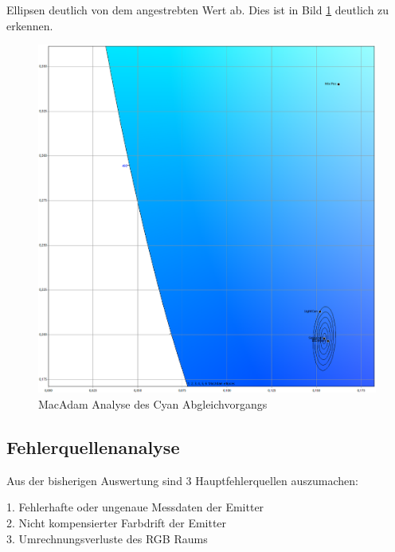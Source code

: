 \documentclass[11pt]{scrartcl}
\begin{document}
Ellipsen deutlich von dem angestrebten Wert ab. Dies ist in Bild \ref{fig:macAdamCyan} deutlich zu erkennen.
\begin{figure}[H]
    \begin{center}
        \includegraphics[width=.9\textwidth]{images/macAdam/comparedCyan_mix.png}
    \end{center}
    \caption{MacAdam Analyse des Cyan Abgleichvorgangs} \label{fig:macAdamCyan}
\end{figure}
\noindent
\subsection{Fehlerquellenanalyse}
Aus der bisherigen Auswertung sind 3 Hauptfehlerquellen auszumachen:
\begin{addmargin}[2em]{0em}
    1. Fehlerhafte oder ungenaue Messdaten der Emitter\\
    2. Nicht kompensierter Farbdrift der Emitter\\
    3. Umrechnungsverluste des RGB Raums
\end{addmargin}
\end{document}
